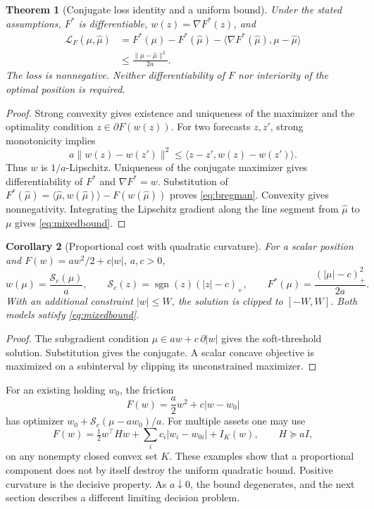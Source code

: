 \documentclass[11pt]{article}
\theoremstyle{plain}
\newtheorem{theorem}{Theorem}[section]
\newtheorem{corollary}[theorem]{Corollary}
\theoremstyle{definition}
\theoremstyle{remark}
\newcommand{\norm}[1]{\lVert#1\rVert}
\DeclareMathOperator{\sgn}{sgn}
\newcommand{\soft}{\mathcal S}
\begin{document}
\begin{theorem}[Conjugate loss identity and a uniform bound]\label{thm:conjugate}
Under the stated assumptions, \(F^\ast\) is differentiable,
\(w(z)=\nabla F^\ast(z)\), and
\begin{align}
\mathcal L_F(\mu,\widehat\mu)
&=F^\ast(\mu)-F^\ast(\widehat\mu)
 -\langle\nabla F^\ast(\widehat\mu),\mu-\widehat\mu\rangle
\label{eq:bregman}\\
&\le\frac{\norm{\mu-\widehat\mu}^2}{2a}.
\label{eq:mixedbound}
\end{align}
The loss is nonnegative. Neither differentiability of \(F\) nor
interiority of the optimal position is required.
\end{theorem}
\begin{proof}
Strong convexity gives existence and uniqueness of the maximizer and
the optimality condition \(z\in\partial F(w(z))\).
For two forecasts \(z,z'\), strong monotonicity implies
\[
a\norm{w(z)-w(z')}^2
\le\langle z-z',w(z)-w(z')\rangle.
\]
Thus \(w\) is \(1/a\)-Lipschitz. Uniqueness of the conjugate maximizer
gives differentiability of \(F^\ast\) and \(\nabla F^\ast=w\).
Substitution of
\(F^\ast(\widehat\mu)=\langle\widehat\mu,w(\widehat\mu)\rangle
-F(w(\widehat\mu))\) proves \eqref{eq:bregman}.
Convexity gives nonnegativity. Integrating the Lipschitz gradient along
the line segment from \(\widehat\mu\) to \(\mu\) gives
\eqref{eq:mixedbound}.
\end{proof}

\begin{corollary}[Proportional cost with quadratic curvature]\label{cor:soft}
For a scalar position and \(F(w)=aw^2/2+c|w|\), \(a,c>0\),
\[
w(\mu)=\frac{\soft_c(\mu)}a,\qquad
\soft_c(z)=\sgn(z)(|z|-c)_+,\qquad
F^\ast(\mu)=\frac{(|\mu|-c)_+^2}{2a}.
\]
With an additional constraint \(|w|\le W\), the solution is clipped to
\([-W,W]\). Both models satisfy \eqref{eq:mixedbound}.
\end{corollary}
\begin{proof}
The subgradient condition \(\mu\in aw+c\,\partial|w|\) gives the
soft-threshold solution. Substitution gives the conjugate. A scalar
concave objective is maximized on a subinterval by clipping its
unconstrained maximizer.
\end{proof}

For an existing holding \(w_0\), the friction
\[
F(w)=\frac a2w^2+c|w-w_0|
\]
has optimizer \(w_0+\soft_c(\mu-aw_0)/a\).
For multiple assets one may use
\[
F(w)=\tfrac12w^\top H w+\sum_i c_i|w_i-w_{0i}|+I_K(w),
\qquad H\succeq aI,
\]
on any nonempty closed convex set \(K\).
These examples show that a proportional component does not by itself
destroy the uniform quadratic bound. Positive curvature is the
decisive property. As \(a\downarrow0\), the bound degenerates, and the
next section describes a different limiting decision problem.
\end{document}
